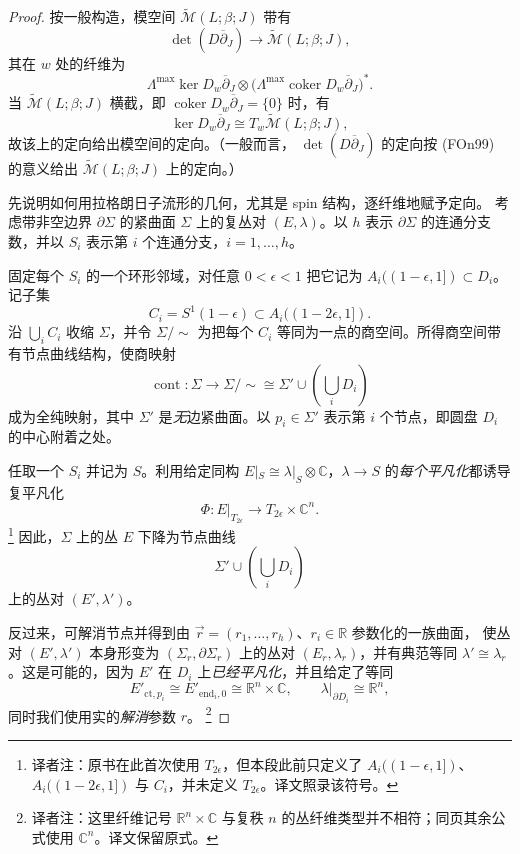 \begin{proof}
按一般构造，模空间 $\widetilde{\mathcal M}(L;\beta;J)$ 带有\termDeterminantLineBundle{}
\[
 \det(D\overline\partial_J)\longrightarrow
 \widetilde{\mathcal M}(L;\beta;J),
\]
其在 $w$ 处的纤维为
\[
 \Lambda^{\max}\ker D_w\overline\partial_J
 \otimes\bigl(\Lambda^{\max}\operatorname{coker}D_w\overline\partial_J\bigr)^*.
\]
当 $\widetilde{\mathcal M}(L;\beta;J)$ 横截，即
$\operatorname{coker}D_w\overline\partial_J=\{0\}$ 时，有
\[
 \ker D_w\overline\partial_J\cong T_w\widetilde{\mathcal M}(L;\beta;J),
\]
故该\termDeterminantLineBundle{}上的定向给出模空间的定向。（一般而言，
$\det(D\overline\partial_J)$ 的定向按 (FOn99) 的意义给出
$\widetilde{\mathcal M}(L;\beta;J)$ 上\termKuranishiStructure{}的定向。）

先说明如何用拉格朗日子流形的几何，尤其是 spin 结构，逐纤维地赋予定向。
考虑带非空边界 $\partial\Sigma$ 的紧\personRiemann{}曲面 $\Sigma$ 上的复丛对
$(E,\lambda)$。以 $h$ 表示 $\partial\Sigma$ 的连通分支数，并以 $S_i$
表示第 $i$ 个连通分支，$i=1,\ldots,h$。

固定每个 $S_i$ 的一个环形邻域，对任意 $0<\epsilon<1$ 把它记为
$A_i((1-\epsilon,1])\subset D_i$。记子集
\[
 C_i=S^1(1-\epsilon)\subset A_i((1-2\epsilon,1]).
\]
沿 $\bigcup_iC_i$ 收缩 $\Sigma$，并令 $\Sigma/{\sim}$ 为把每个 $C_i$
等同为一点的商空间。所得商空间带有节点曲线结构，使商映射
\[
 \operatorname{cont}:\Sigma\longrightarrow\Sigma/{\sim}
 \cong\Sigma'\cup\left(\bigcup_iD_i\right)
\]
成为全纯映射，其中 $\Sigma'$ 是\emph{无}边紧\personRiemann{}曲面。以
$p_i\in\Sigma'$ 表示第 $i$ 个节点，即圆盘 $D_i$ 的中心附着之处。

任取一个 $S_i$ 并记为 $S$。利用给定同构
$E|_S\cong\lambda|_S\otimes\mathbb C$，$\lambda\to S$ 的\emph{每个平凡化}都诱导复平凡化
\begin{equation}
 \Phi:E|_{T_{2\epsilon}}\longrightarrow T_{2\epsilon}\times\mathbb C^n.
 \label{eq:boundary-trivialization-T-epsilon}
\end{equation}
\footnote{译者注：原书在此首次使用 $T_{2\epsilon}$，但本段此前只定义了
$A_i((1-\epsilon,1])$、$A_i((1-2\epsilon,1])$ 与 $C_i$，并未定义
$T_{2\epsilon}$。译文照录该符号。}
因此，$\Sigma$ 上的丛 $E$ 下降为节点曲线
\[
 \Sigma'\cup\left(\bigcup_iD_i\right)
\]
上的丛对 $(E',\lambda')$。

反过来，可解消节点并得到由
$\vec r=(r_1,\ldots,r_h)$、$r_i\in\mathbb R$ 参数化的一族\personRiemann{}曲面，
使丛对 $(E',\lambda')$ 本身形变为 $(\Sigma_r,\partial\Sigma_r)$ 上的丛对
$(E_r,\lambda_r)$，并有典范等同 $\lambda'\cong\lambda_r$。这是可能的，因为
$E'$ 在 $D_i$ 上\emph{已经平凡化}，并且给定了等同
\[
 E'_{\mathrm{ct},p_i}\cong E'_{\mathrm{end}_i,0}
 \cong\mathbb R^n\times\mathbb C,
 \qquad \lambda|_{\partial D_i}\cong\mathbb R^n,
\]
同时我们使用实的\emph{解消}参数 $r$。
\footnote{译者注：这里纤维记号 $\mathbb R^n\times\mathbb C$ 与复秩 $n$
的丛纤维类型并不相符；同页其余公式使用 $\mathbb C^n$。译文保留原式。}


\end{proof}
